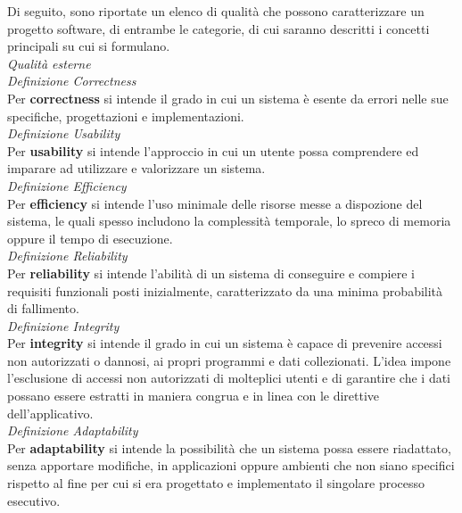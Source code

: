 \documentclass{article}
\begin{document}
Di seguito, sono riportate un elenco di qualità che possono caratterizzare un progetto software, di entrambe le categorie, di cui saranno descritti i concetti principali su cui si formulano.\vspace*{14pt}\\
\textit{Qualità esterne}\\
\textit{Definizione Correctness}\\
Per \textbf{correctness} si intende il grado in cui un sistema è esente da errori nelle sue specifiche, progettazioni e implementazioni.\vspace*{14pt}\\
\textit{Definizione Usability}\\
Per \textbf{usability} si intende l'approccio in cui un utente possa comprendere ed imparare ad utilizzare e valorizzare un sistema.\vspace*{14pt}\\
\textit{Definizione Efficiency}\\
Per \textbf{efficiency} si intende l'uso minimale delle risorse messe a dispozione del sistema, le quali spesso includono la complessità temporale, lo spreco di memoria oppure il tempo di esecuzione.\vspace*{14pt}\\
\textit{Definizione Reliability}\\
Per \textbf{reliability} si intende l'abilità di un sistema di conseguire e compiere i requisiti funzionali posti inizialmente, caratterizzato da una minima probabilità di fallimento.\vspace*{14pt}\\
\textit{Definizione Integrity}\\
Per \textbf{integrity} si intende il grado in cui un sistema è capace di prevenire accessi non autorizzati o dannosi, ai propri programmi e dati collezionati. L'idea impone l'esclusione di accessi non autorizzati di molteplici utenti e di garantire che i dati possano essere estratti in maniera congrua e in linea con le direttive dell'applicativo.\vspace*{14pt}\\
\textit{Definizione Adaptability}\\
Per \textbf{adaptability} si intende la possibilità che un sistema possa essere riadattato, senza apportare modifiche, in applicazioni oppure ambienti che non siano specifici rispetto al fine per cui si era progettato e implementato il singolare processo esecutivo.\vspace*{14pt}\\
\end{document}
